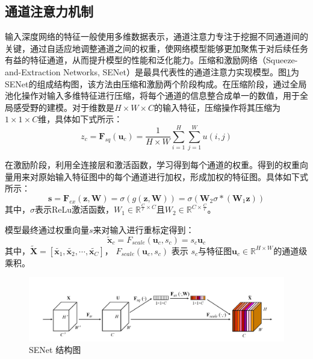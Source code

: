 \subsection{通道注意力机制}
输入深度网络的特征一般使用多维数据表示，通道注意力专注于挖掘不同通道间的关键，通过自适应地调整通道之间的权重，使网络模型能够更加聚焦于对后续任务有益的特征通道，从而提升模型的性能和泛化能力。压缩和激励网络（Squeeze-and-Extraction Networks, SENet）是最具代表性的通道注意力实现模型。图\ref{SENet}为SENet的组成结构图，该方法由压缩和激励两个阶段构成。在压缩阶段，通过全局池化操作对输入多维特征进行压缩，将每个通道的信息整合成单一的数值，用于全局感受野的建模。对于维数是$H\times W \times C$的输入特征，压缩操作将其压缩为$1 \times 1 \times C$维，具体如下式所示：
\begin{equation}
    z_c=\mathbf{F}_{sq}\left( \mathbf{u}_c \right) =\frac{1}{H\times W}\sum_{i=1}^H{\sum_{j=1}^W{u\left( i,j \right)}}
\end{equation}

在激励阶段，利用全连接层和激活函数，学习得到每个通道的权重。得到的权重向量用来对原始输入特征图中的每个通道进行加权，形成加权的特征图。具体如下式所示：
\begin{equation}
    \mathbf{s}=\mathbf{F}_{ex}\left( \mathbf{z},\mathbf{W} \right) =\sigma \left( g\left( \mathbf{z},\mathbf{W} \right) \right) =\sigma \left( \mathbf{W}_2\sigma *\left( \mathbf{W}_1\mathbf{z} \right) \right)
\end{equation}
其中，$\sigma$表示ReLu激活函数，$W_1 \in \mathbb{R}^{\frac{C}{r}\times C}$且$W_2 \in \mathbb{R}^{C \times \frac{C}{r}}$。

模型最终通过权重向量$s$来对输入进行重标定得到：
\begin{equation}
    \widetilde{\mathbf{x}}_c=F_{scale}\left( \mathbf{u}_c,s_c \right) =s_c\mathbf{u}_c
\end{equation}
其中，$ \widetilde{\mathbf{X}}=\left[ \widetilde{\mathbf{x}_1},\widetilde{\mathbf{x}_2},\cdots ,\widetilde{\mathbf{x}_C} \right] $， $F_{scale}\left( \mathbf{u}_c,s_c \right)$ 表示 $s_c$与特征图$\mathbf{u}_c \in \mathbb{R}^{H\times W}$的通道级乘积。


\begin{figure}[h]
    \centering
    \includegraphics[width=14cm]{pic/chapter3/SENet.jpg}
    \caption{SENet 结构图}
    \label{SENet}
\end{figure}


